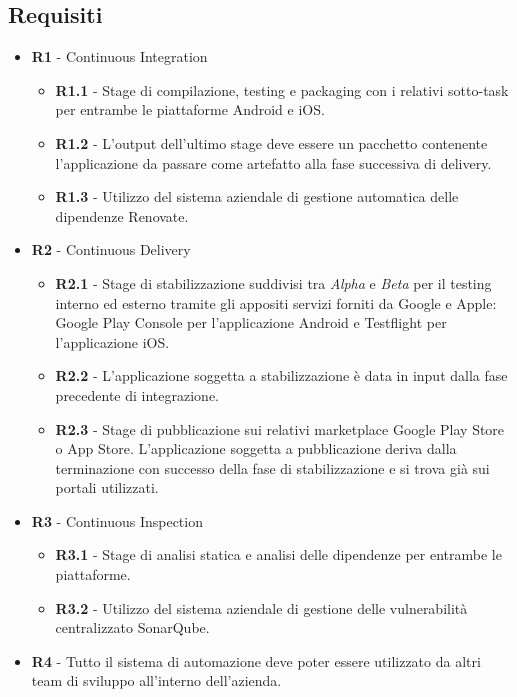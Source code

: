 \subsection{Requisiti}
\begin{itemize}
    \item \textbf{R1} - Continuous Integration
    \begin{itemize}
        \item \textbf{R1.1} - Stage di compilazione, testing e packaging con i relativi sotto-task per entrambe le piattaforme Android e iOS.
        
        \item \textbf{R1.2} - L'output dell'ultimo stage deve essere un pacchetto contenente l'applicazione da passare come artefatto alla fase successiva di delivery.
        
        \item \textbf{R1.3} - Utilizzo del sistema aziendale di gestione automatica delle dipendenze Renovate.
    \end{itemize}
    
    \item \textbf{R2} - Continuous Delivery
    \begin{itemize}
        \item \textbf{R2.1} - Stage di stabilizzazione suddivisi tra \textit{Alpha} e \textit{Beta} per il testing interno ed esterno tramite gli appositi servizi forniti da Google e Apple: Google Play Console per l'applicazione Android e Testflight per l'applicazione iOS.
        
        \item \textbf{R2.2} - L'applicazione soggetta a stabilizzazione è data in input dalla fase precedente di integrazione.
        
        \item \textbf{R2.3} - Stage di pubblicazione sui relativi marketplace Google Play Store o App Store. L'applicazione soggetta a pubblicazione deriva dalla terminazione con successo della fase di stabilizzazione e si trova già sui portali utilizzati.
    \end{itemize}
    
    \item \textbf{R3} - Continuous Inspection
    \begin{itemize}
        \item \textbf{R3.1} - Stage di analisi statica e analisi delle dipendenze per entrambe le piattaforme.
        
        \item \textbf{R3.2} - Utilizzo del sistema aziendale di gestione delle vulnerabilità centralizzato SonarQube.
    \end{itemize}
    
    \item \textbf{R4} - Tutto il sistema di automazione deve poter essere utilizzato da altri team di sviluppo all'interno dell'azienda.
\end{itemize}

